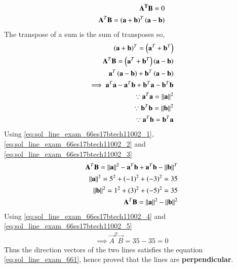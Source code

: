 \begin{align}
\mathbf{A^T}\mathbf{B}= 0\label{eq:sol_line_exam_661}\\
\mathbf{A}^T\mathbf{B}=\left(\mathbf{a}+\mathbf{b}\right)^T\left(\mathbf{a}-\mathbf{b}\right)
\end{align}
The transpose of a sum is the sum of transposes so,
\begin{align}
\left(\mathbf{a}+\mathbf{b}\right)^T = \left(\mathbf{a}^T+\mathbf{b}^T\right) \\
    \mathbf{A}^T\mathbf{B} = \left(\mathbf{a}^T+ \mathbf{b}^T\right)\left(\mathbf{a}-\mathbf{b}\right)\\
    \mathbf{a}^T\left(\mathbf{a}-\mathbf{b}\right)+\mathbf{b}^T\left(\mathbf{a}-\mathbf{b}\right)\\
    \implies\mathbf{a}^T\mathbf{a}-\mathbf{a}^T\mathbf{b}+\mathbf{b}^T\mathbf{a}-\mathbf{b}^T\mathbf{b}\\
    \because\mathbf{a}^T\mathbf{a}= \left\lVert\mathbf{a}\right\rVert^2\label{eq:sol_line_exam_66es17btech11002_1}\\
    \because\mathbf{b}^T\mathbf{b}= \left\lVert\mathbf{b}\right\rVert^2\label{eq:sol_line_exam_66es17btech11002_2}\\
    \because\mathbf{a}^T\mathbf{b}=\mathbf{b}^T\mathbf{a}\label{eq:sol_line_exam_66es17btech11002_3}
\end{align}
Using \eqref{eq:sol_line_exam_66es17btech11002_1}, \eqref{eq:sol_line_exam_66es17btech11002_2}  and \eqref{eq:sol_line_exam_66es17btech11002_3}
\begin{align}
    \mathbf{A}^T\mathbf{B}= \left\lVert\mathbf{a}\right\rVert^2-\mathbf{a}^T\mathbf{b}+\mathbf{a}^T\mathbf{b}-\left\lVert\mathbf{b}\right\rVert^T\\
    \left\lVert\mathbf{a}\right\rVert^2= 5^2+(-1)^2+(-3)^2= 35\label{eq:sol_line_exam_66es17btech11002_4}\\ 
    \left\lVert\mathbf{b}\right\rVert^2= 1^2+(3)^2+(-5)^2= 35\label{eq:sol_line_exam_66es17btech11002_5}\\ 
    \mathbf{A}^T\mathbf{B}= \left\lVert\mathbf{a}\right\rVert^2-\left\lVert\mathbf{b}\right\rVert^2
\end{align}
Using \eqref{eq:sol_line_exam_66es17btech11002_4}  and \eqref{eq:sol_line_exam_66es17btech11002_5} \\ 
\begin{align}
   \implies\vec{A}^T\vec{B}= 35-35 = 0 
\end{align}
Thus the direction vectors of the two lines satisfies the equation \ref{eq:sol_line_exam_661}, hence proved that the lines are \textbf{perpendicular}.
